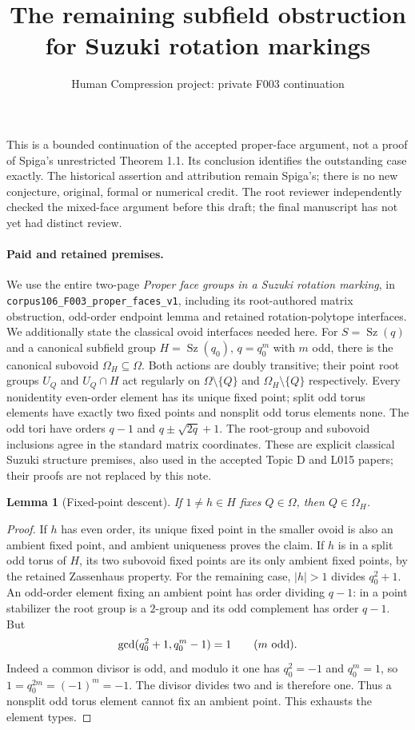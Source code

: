 \documentclass[11pt,a4paper]{article}
\title{The remaining subfield obstruction for Suzuki rotation markings}
\author{Human Compression project: private F003 continuation}\date{}
\newtheorem{lemma}{Lemma}\newtheorem{proposition}[lemma]{Proposition}
\newcommand{\Sz}{\operatorname{Sz}}\newcommand{\gen}[1]{\langle#1\rangle}
\begin{document}
\maketitle
This is a bounded continuation of the accepted proper-face argument, not
a proof of Spiga's unrestricted Theorem 1.1. Its conclusion identifies
the outstanding case exactly. The historical assertion and attribution
remain Spiga's; there is no new conjecture, original, formal or numerical
credit. The root reviewer independently checked the mixed-face argument
before this draft; the final manuscript has not yet had distinct review.

\paragraph{Paid and retained premises.}
We use the entire two-page \emph{Proper face groups in a Suzuki rotation
marking}, in \texttt{corpus106\_F003\_proper\_faces\_v1}, including its
root-authored matrix obstruction, odd-order endpoint lemma and retained
rotation-polytope interfaces. We additionally state the classical ovoid
interfaces needed here. For $S=\Sz(q)$ and a canonical subfield group
$H=\Sz(q_0)$, $q=q_0^m$ with $m$ odd, there is the canonical subovoid
$\Omega_H\subseteq\Omega$. Both actions are doubly transitive; their
point root groups $U_Q$ and $U_Q\cap H$ act regularly on
$\Omega\setminus\{Q\}$ and $\Omega_H\setminus\{Q\}$ respectively.
Every nonidentity even-order element has its unique fixed point; split
odd torus elements have exactly two fixed points and nonsplit odd torus
elements none. The odd tori have orders $q-1$ and
$q\pm\sqrt{2q}+1$. The root-group and subovoid inclusions agree in the
standard matrix coordinates. These are explicit classical Suzuki
structure premises, also used in the accepted Topic D and L015 papers;
their proofs are not replaced by this note.

\begin{lemma}[Fixed-point descent]\label{fixed}
If $1\ne h\in H$ fixes $Q\in\Omega$, then $Q\in\Omega_H$.
\end{lemma}
\begin{proof}
If $h$ has even order, its unique fixed point in the smaller ovoid is
also an ambient fixed point, and ambient uniqueness proves the claim.
If $h$ is in a split odd torus of $H$, its two subovoid fixed points
are its only ambient fixed points, by the retained Zassenhaus property.
For the remaining case, $|h|>1$ divides $q_0^2+1$. An odd-order element
fixing an ambient point has order dividing $q-1$: in a point stabilizer
the root group is a $2$-group and its odd complement has order $q-1$.
But
\[
 \gcd(q_0^2+1,q_0^m-1)=1 \qquad(m\ \hbox{odd}).
\]
Indeed a common divisor is odd, and modulo it one has $q_0^2=-1$ and
$q_0^m=1$, so $1=q_0^{2m}=(-1)^m=-1$. The divisor divides two and
is therefore one. Thus a nonsplit odd torus element cannot fix an
ambient point. This exhausts the element types.
\end{proof}
\end{document}
